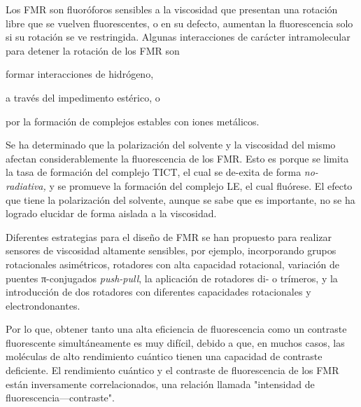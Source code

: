 \documentclass[spanish,mexico]{scrartcl}
\begin{document}
Los \gls{FMR} son fluoróforos sensibles a la viscosidad que presentan una rotación libre que se vuelven fluorescentes, o en su defecto, aumentan la fluorescencia solo si su rotación se ve restringida. Algunas interacciones de carácter intramolecular para detener la rotación de los \gls{FMR} son \begin{inparaenum}[i.]
    \item formar interacciones de hidrógeno,\autocite{wuMultistageRotationalSpeed2018}
    \item a través del impedimento estérico,\autocite{faulknerAllostericRegulationRotational2016} o
    \item por la formación de complejos estables con iones metálicos.\autocite{yadavViscochromicMechanochromicUnsymmetrical2019}
\end{inparaenum}

Se ha determinado que la polarización del solvente y la viscosidad del mismo afectan considerablemente la fluorescencia de los \gls{FMR}. Esto es porque se limita la tasa de formación del complejo \gls{TICT}, el cual se de-exita de forma \emph{no-radiativa,} y se promueve la formación del complejo \gls{LE}, el cual fluórese. El efecto que tiene la polarización del solvente, aunque se sabe que es importante, no se ha logrado elucidar de forma aislada a la viscosidad.\cite{haidekkerEffectsSolventPolarity2005}

Diferentes estrategias para el diseño de \gls{FMR} se han propuesto para realizar sensores de viscosidad altamente sensibles, por ejemplo, incorporando grupos rotacionales asimétricos,\autocite{leePyrrolicMolecularRotors2016} rotadores con alta capacidad rotacional,\autocite{karpenkoPushPullDioxaborine2016} variación de puentes π-conjugados \emph{push-pull},\autocite{karpenkoPushPullDioxaborine2016} la aplicación de rotadores di- o trímeros,\autocite{kimballBODIPYBODIPYDyad2015} y la introducción de dos rotadores con diferentes capacidades rotacionales y electrondonantes.\autocite{rautTriazinebasedBODIPYTrimer2016}

Por lo que, obtener tanto una alta eficiencia de fluorescencia como un contraste fluorescente simultáneamente es muy difícil, debido a que, en muchos casos, las moléculas de alto rendimiento cuántico tienen una capacidad de contraste deficiente.
El rendimiento cuántico y el contraste de fluorescencia de los \gls{FMR} están inversamente correlacionados, una relación llamada "intensidad de fluorescencia---contraste".\autocite{leeFrontCoverFluorescent2018}
\end{document}
